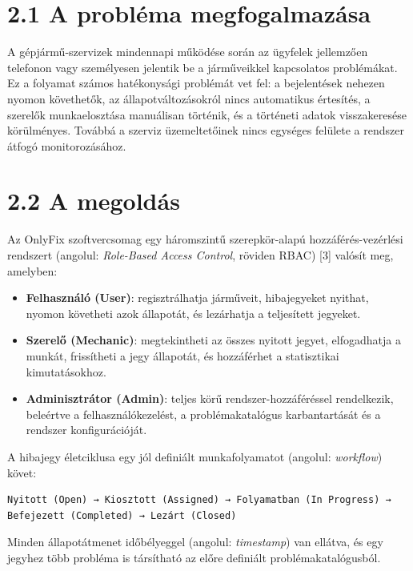 \section{2.1 A probléma megfogalmazása}\label{a-probluxe9ma-megfogalmazuxe1sa}

A gépjármű-szervizek mindennapi működése során az ügyfelek jellemzően telefonon vagy személyesen jelentik be a járműveikkel kapcsolatos problémákat. Ez a folyamat számos hatékonysági problémát vet fel: a bejelentések nehezen nyomon követhetők, az állapotváltozásokról nincs automatikus értesítés, a szerelők munkaelosztása manuálisan történik, és a történeti adatok visszakeresése körülményes. Továbbá a szerviz üzemeltetőinek nincs egységes felülete a rendszer átfogó monitorozásához.

\section{2.2 A megoldás}\label{a-megolduxe1s}

Az OnlyFix szoftvercsomag egy háromszintű szerepkör-alapú hozzáférés-vezérlési rendszert (angolul: \emph{Role-Based Access Control}, röviden RBAC) {[}3{]} valósít meg, amelyben:

\begin{itemize}
\item
  \textbf{Felhasználó (User)}: regisztrálhatja járműveit, hibajegyeket nyithat, nyomon követheti azok állapotát, és lezárhatja a teljesített jegyeket.
\item
  \textbf{Szerelő (Mechanic)}: megtekintheti az összes nyitott jegyet, elfogadhatja a munkát, frissítheti a jegy állapotát, és hozzáférhet a statisztikai kimutatásokhoz.
\item
  \textbf{Adminisztrátor (Admin)}: teljes körű rendszer-hozzáféréssel rendelkezik, beleértve a felhasználókezelést, a problémakatalógus karbantartását és a rendszer konfigurációját.
\end{itemize}

A hibajegy életciklusa egy jól definiált munkafolyamatot (angolul: \emph{workflow}) követ:

\begin{verbatim}
Nyitott (Open) → Kiosztott (Assigned) → Folyamatban (In Progress) → Befejezett (Completed) → Lezárt (Closed)
\end{verbatim}

Minden állapotátmenet időbélyeggel (angolul: \emph{timestamp}) van ellátva, és egy jegyhez több probléma is társítható az előre definiált problémakatalógusból.

